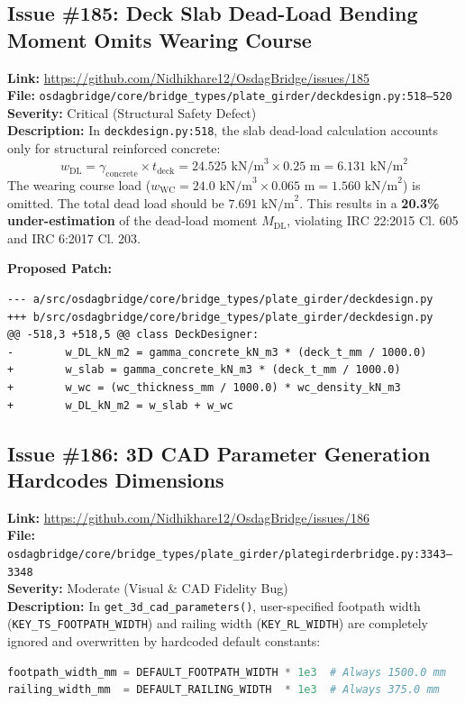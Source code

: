 \documentclass[11pt,a4paper]{article}
\begin{document}
\subsection{Issue \#185: Deck Slab Dead-Load Bending Moment Omits Wearing Course}
\textbf{Link:} \href{https://github.com/Nidhikhare12/OsdagBridge/issues/185}{https://github.com/Nidhikhare12/OsdagBridge/issues/185}\\
\textbf{File:} \texttt{osdagbridge/core/bridge\_types/plate\_girder/deckdesign.py:518--520}\\
\textbf{Severity:} Critical (Structural Safety Defect)\\
\textbf{Description:} In \texttt{deckdesign.py:518}, the slab dead-load calculation accounts only for structural reinforced concrete:
\begin{equation}
w_{\text{DL}} = \gamma_{\text{concrete}} \times t_{\text{deck}} = 24.525\text{ kN/m}^3 \times 0.25\text{ m} = 6.131\text{ kN/m}^2
\end{equation}
The wearing course load ($w_{\text{WC}} = 24.0\text{ kN/m}^3 \times 0.065\text{ m} = 1.560\text{ kN/m}^2$) is omitted. The total dead load should be $7.691\text{ kN/m}^2$. This results in a \textbf{20.3\% under-estimation} of the dead-load moment $M_{\text{DL}}$, violating IRC 22:2015 Cl. 605 and IRC 6:2017 Cl. 203.

\textbf{Proposed Patch:}
\begin{lstlisting}
--- a/src/osdagbridge/core/bridge_types/plate_girder/deckdesign.py
+++ b/src/osdagbridge/core/bridge_types/plate_girder/deckdesign.py
@@ -518,3 +518,5 @@ class DeckDesigner:
-        w_DL_kN_m2 = gamma_concrete_kN_m3 * (deck_t_mm / 1000.0)
+        w_slab = gamma_concrete_kN_m3 * (deck_t_mm / 1000.0)
+        w_wc = (wc_thickness_mm / 1000.0) * wc_density_kN_m3
+        w_DL_kN_m2 = w_slab + w_wc
\end{lstlisting}

\subsection{Issue \#186: 3D CAD Parameter Generation Hardcodes Dimensions}
\textbf{Link:} \href{https://github.com/Nidhikhare12/OsdagBridge/issues/186}{https://github.com/Nidhikhare12/OsdagBridge/issues/186}\\
\textbf{File:} \texttt{osdagbridge/core/bridge\_types/plate\_girder/plategirderbridge.py:3343--3348}\\
\textbf{Severity:} Moderate (Visual \& CAD Fidelity Bug)\\
\textbf{Description:} In \texttt{get\_3d\_cad\_parameters()}, user-specified footpath width (\texttt{KEY\_TS\_FOOTPATH\_WIDTH}) and railing width (\texttt{KEY\_RL\_WIDTH}) are completely ignored and overwritten by hardcoded default constants:
\begin{lstlisting}[language=Python]
footpath_width_mm = DEFAULT_FOOTPATH_WIDTH * 1e3  # Always 1500.0 mm
railing_width_mm  = DEFAULT_RAILING_WIDTH  * 1e3  # Always 375.0 mm
\end{lstlisting}
\end{document}
